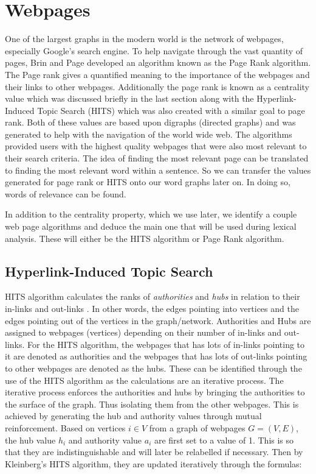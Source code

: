 \section{Webpages}
One of the largest graphs in the modern world is the network of webpages, especially Google's search engine. To help navigate through the vast quantity of pages, Brin and Page \cite{brin1998anatomy} developed an algorithm known as the Page Rank algorithm. The Page rank gives a quantified meaning to the importance of the webpages and their links to other webpages. Additionally the page rank is known as a centrality value which was discussed briefly in the last section along with the Hyperlink-Induced Topic Search (HITS) which was also created with a similar goal to page rank. Both of these values are based upon digraphs (directed graphs) and was generated to help with the navigation of the world wide web. The algorithms provided users with the highest quality webpages that were also most relevant to their search criteria. The idea of finding the most relevant page can be translated to finding the most relevant word within a sentence. So we can transfer the values generated for page rank or HITS onto our word graphs later on. In doing so, words of relevance can be found.

In addition to the centrality property, which we use later, we identify a couple web page algorithms and deduce the main one that will be used during lexical analysis. These will either be the HITS algorithm or Page Rank algorithm.

\subsection{Hyperlink-Induced Topic Search}
HITS algorithm calculates the ranks of \emph{authorities} and \emph{hubs} in relation to their in-links and out-links \cite{langville2005survey}. In other words, the edges pointing into vertices and the edges pointing out of the vertices in the graph/network.  Authorities and Hubs are assigned to webpages (vertices) depending on their number of in-links and out-links. For the HITS algorithm, the webpages that has lots of in-links pointing to it are denoted as authorities and the webpages that has lots of out-links pointing to other webpages are denoted as the hubs. These can be identified through the use of the HITS algorithm as the calculations are an iterative process. The iterative process enforces the authorities and hubs by bringing the authorities to the surface of the graph. Thus isolating them from the other webpages. This is achieved by generating the hub and authority values through mutual reinforcement. Based on vertices $i \in V$ from a graph of webpages $G = (V , E)$, the hub value $h_i$ and authority value $a_i$ are first set to a value of 1. This is so that they are indistinguishable and will later be relabelled if necessary. Then by Kleinberg's HITS algorithm, they are updated iteratively through the formulas:

